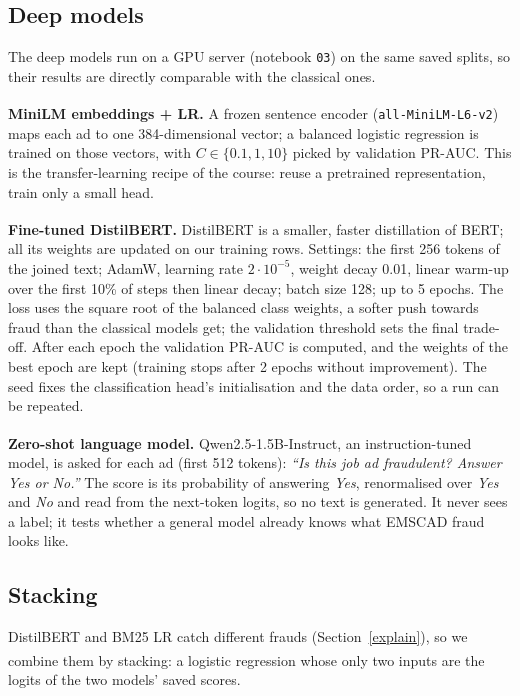 \subsection{Deep models}

The deep models run on a GPU server (notebook \texttt{03}) on the same saved splits, so their
results are directly comparable with the classical ones.

\textbf{MiniLM embeddings + LR.} A frozen sentence encoder
(\texttt{all-MiniLM-L6-v2}\textsuperscript{\cite{reimers2019,wang2020minilm}}) maps each ad to one
384-dimensional vector; a balanced logistic regression is trained on those vectors, with $C \in
\{0.1, 1, 10\}$ picked by validation PR-AUC. This is the transfer-learning recipe of the course:
reuse a pretrained representation, train only a small head.

\textbf{Fine-tuned DistilBERT.} DistilBERT\textsuperscript{\cite{sanh2019}} is a smaller, faster
distillation of BERT\textsuperscript{\cite{devlin2019}}; all its weights are updated on our training
rows. Settings: the first 256 tokens of the joined text; AdamW, learning rate $2 \cdot 10^{-5}$,
weight decay 0.01, linear warm-up over the first 10\% of steps then linear decay; batch size 128;
up to 5 epochs. The loss uses the square root of the balanced class weights, a softer push towards
fraud than the classical models get; the validation threshold sets the final trade-off. After each
epoch the validation PR-AUC is computed, and the weights of the best epoch are kept (training stops
after 2 epochs without improvement). The seed fixes the classification head's initialisation and
the data order, so a run can be repeated.

\textbf{Zero-shot language model.} Qwen2.5-1.5B-Instruct\textsuperscript{\cite{qwen2024}}, an
instruction-tuned model, is asked for each ad (first 512 tokens): \emph{``Is this job ad
fraudulent? Answer Yes or No.''} The score is its probability of answering \emph{Yes}, renormalised
over \emph{Yes} and \emph{No} and read from the next-token logits, so no text is generated. It never
sees a label; it tests whether a general model already knows what EMSCAD fraud looks like.

\subsection{Stacking}
\label{stacking}

DistilBERT and BM25 LR catch different frauds (Section~\ref{explain}), so we combine them by
stacking\textsuperscript{\cite{wolpert1992}}: a logistic regression whose only two inputs are the
logits of the two models' saved scores.

